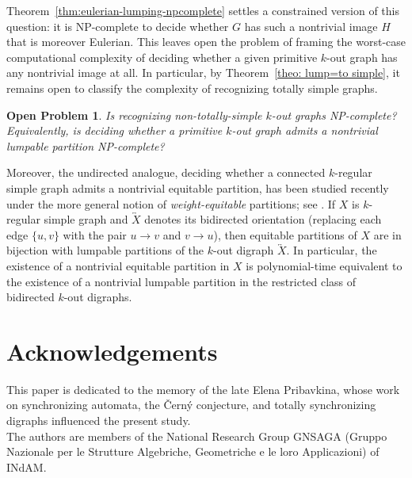 \documentclass[a4paper,10pt]{amsart}
\theoremstyle{plain}
\newtheorem{open}[theorem]{Open Problem}
\theoremstyle{definition}
\begin{document}
Theorem~\ref{thm:eulerian-lumping-npcomplete} settles a constrained version of this question: it is NP-complete to decide
whether $G$ has such a nontrivial image $H$ that is moreover Eulerian. This leaves open the problem of framing the worst-case computational complexity of deciding whether a given primitive $k$-out graph has any nontrivial image at all. In particular, by Theorem~\ref{theo: lump=to simple}, it remains open to classify the complexity of recognizing totally simple graphs.
\begin{open}
Is recognizing non-totally-simple $k$-out graphs NP-complete?
Equivalently, is deciding whether a primitive $k$-out graph admits a nontrivial lumpable partition NP-complete?
\end{open}
Moreover, the undirected analogue, deciding whether a connected $k$-regular simple graph admits a nontrivial equitable partition, has been studied recently under the more general notion of \emph{weight-equitable} partitions; see \cite{AbiadHojnyZeijlemakerWEP}.
If $X$ is $k$-regular simple graph and $\overleftrightarrow{X}$ denotes its bidirected orientation (replacing each edge $\{u,v\}$ with the pair $u\to v$ and $v\to u$), then equitable partitions of $X$ are in bijection with lumpable partitions of the $k$-out digraph $\overleftrightarrow{X}$.
In particular, the existence of a nontrivial equitable partition in $X$ is polynomial-time equivalent to the existence of a nontrivial lumpable partition in the restricted class of bidirected $k$-out digraphs.


\section*{Acknowledgements}
This paper is dedicated to the memory of the late Elena Pribavkina, whose work on synchronizing automata, the Černý conjecture, and totally synchronizing digraphs influenced the present study.
\\
The authors are members of the National Research Group GNSAGA
(Gruppo Nazionale per le Strutture Algebriche, Geometriche e le loro
Applicazioni) of INdAM.


\printbibliography
\end{document}
